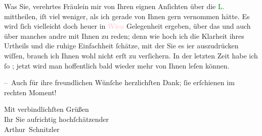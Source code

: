 \pstart
           Was Sie, verehrtes Fräulein {\pb}mir von Ihren eignen Anſichten über die \textcolor{green}{L.}\ledrightnote{\textcolor{green}{Liebelei. Schauspiel in drei Akten}} mittheilen, iſt viel weniger, als ich gerade von
               Ihnen gern vernommen hätte. Es wird ſich vielleicht doch heuer in \textcolor{pink}{Wien}\ledrightnote{\textcolor{pink}{Wien}} Gelegenheit ergeben, 
               über das und auch über manches andre mit Ihnen zu reden; denn
               wie hoch ich die Klarheit ihres Urtheils und die ruhige Einfachheit ſchätze, mit der
               Sie es i{\geminationm}er {\pb}auszudrücken wiſſen, brauch ich Ihnen
               wohl nicht erſt zu verſichern. In der letzten Zeit habe ich ſo \label{K_L04328-3v}\label{K_L04328-3}; jetzt wird man hoffentlich \introOben{}bald\introOben{} wieder mehr von Ihnen leſen können.\pend
           
\pstart
           – Auch für ihre freundlichen Wünſche herzlichſten Dank; ſie erſchienen im rechten
               Moment!\pend
           
\pstart
           Mit verbindlichſten Grüßen{\\}Ihr Sie aufrichtig hochſchätzender{\\}\spacefill\mbox{Arthur Schnitzler}\pend
           \endnumbering{}
\begin{anhang}
\end{anhang}\newcommand{\dateiname}{L04328}\newcommand{\titel}{Arthur Schnitzler an Marie Herzfeld, 19. 8. 1896}\newcommand{\editorInnen}{Martin Anton Müller und Laura Untner}
